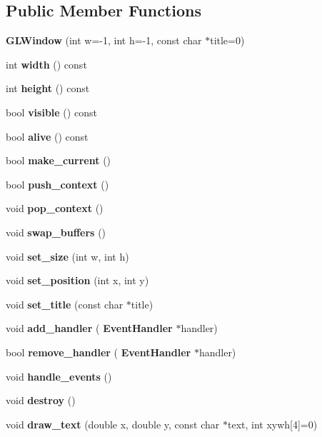 \subsection*{Public Member Functions}
\begin{DoxyCompactItemize}
\item 
\mbox{\label{classglwindow_1_1_g_l_window_af9e5d6539cdf2b606f7f83959cba4d91}} 
{\bfseries G\+L\+Window} (int w=-\/1, int h=-\/1, const char $\ast$title=0)
\item 
\mbox{\label{classglwindow_1_1_g_l_window_ae10e25d700ab0697b2ed42d66a8e4540}} 
int {\bfseries width} () const
\item 
\mbox{\label{classglwindow_1_1_g_l_window_aa3ca7cb6e058f1eef4dd769664f98b14}} 
int {\bfseries height} () const
\item 
\mbox{\label{classglwindow_1_1_g_l_window_a0791d0c8205ba2c2541903cf258a58f4}} 
bool {\bfseries visible} () const
\item 
\mbox{\label{classglwindow_1_1_g_l_window_a8a3a6133efd40d58e6b083469c286825}} 
bool {\bfseries alive} () const
\item 
\mbox{\label{classglwindow_1_1_g_l_window_aee36cf4ab449a96fcaa0f01cd382c618}} 
bool {\bfseries make\+\_\+current} ()
\item 
\mbox{\label{classglwindow_1_1_g_l_window_ad3e8ca520080b92dd961b4d6708a011a}} 
bool {\bfseries push\+\_\+context} ()
\item 
\mbox{\label{classglwindow_1_1_g_l_window_ac3dc676910b6a4f09616e2a3d41ef8ac}} 
void {\bfseries pop\+\_\+context} ()
\item 
\mbox{\label{classglwindow_1_1_g_l_window_a82eaf4b8f8f86ee3cf0cef21aef2a4bd}} 
void {\bfseries swap\+\_\+buffers} ()
\item 
\mbox{\label{classglwindow_1_1_g_l_window_a6e13fa434eb57f3338da78362b225fde}} 
void {\bfseries set\+\_\+size} (int w, int h)
\item 
\mbox{\label{classglwindow_1_1_g_l_window_aa60bf838a81fafa38120424a25a2adef}} 
void {\bfseries set\+\_\+position} (int x, int y)
\item 
\mbox{\label{classglwindow_1_1_g_l_window_ae6a1274fab8ba6831681c43964f97a87}} 
void {\bfseries set\+\_\+title} (const char $\ast$title)
\item 
\mbox{\label{classglwindow_1_1_g_l_window_a00d9e2f4d0e7d3696e32a38df005299b}} 
void {\bfseries add\+\_\+handler} (\textbf{ Event\+Handler} $\ast$handler)
\item 
\mbox{\label{classglwindow_1_1_g_l_window_a13a72e01ab5ee8926dc401f0231d32d3}} 
bool {\bfseries remove\+\_\+handler} (\textbf{ Event\+Handler} $\ast$handler)
\item 
\mbox{\label{classglwindow_1_1_g_l_window_adc3ad89ccb14a800919947c55f4f8f81}} 
void {\bfseries handle\+\_\+events} ()
\item 
\mbox{\label{classglwindow_1_1_g_l_window_a9a6d66c63bfc4796fd10927da3e3114f}} 
void {\bfseries destroy} ()
\item 
\mbox{\label{classglwindow_1_1_g_l_window_a1a8c3e1e280e4c5403a478f5229a3320}} 
void {\bfseries draw\+\_\+text} (double x, double y, const char $\ast$text, int xywh[4]=0)
\end{DoxyCompactItemize}
